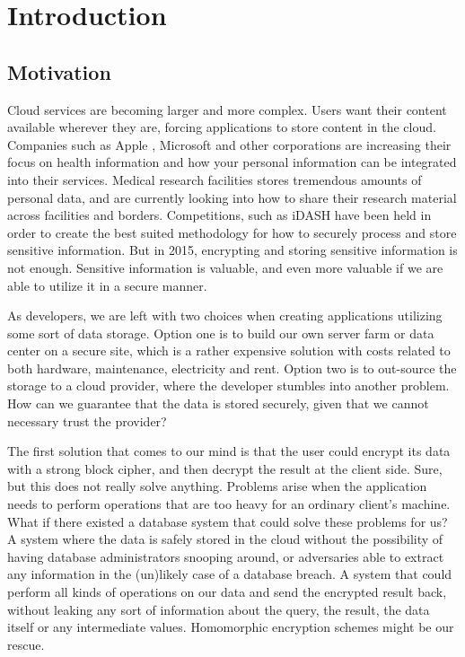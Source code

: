 \chapter{Introduction}
\label{chp:introduction}

\section{Motivation}

Cloud services are becoming larger and more complex. Users want their content available wherever they are, forcing applications to store content in the cloud. Companies such as Apple \cite{apple_health}, Microsoft \cite{microsoft_health} and other corporations are increasing their focus on health information and how your personal information can be integrated into their services. Medical research facilities stores tremendous amounts of personal data, and are currently looking into how to share their research material across facilities and borders. Competitions, such as iDASH \cite{iDASH} have been held in order to create the best suited methodology for how to securely process and store sensitive information. But in 2015, encrypting and storing sensitive information is not enough. Sensitive information is valuable, and even more valuable if we are able to utilize it in a secure manner. 
 

As developers, we are left with two choices when creating applications utilizing some sort of data storage. Option one is to build our own server farm or data center on a secure site, which is a rather expensive solution with costs related to both hardware, maintenance, electricity and rent. Option two is to out-source the storage to a cloud provider, where the developer stumbles into another problem. How can we guarantee that the data is stored securely, given that we cannot necessary trust the provider?

The first solution that comes to our mind is that the user could encrypt its data with a strong block cipher, and then decrypt the result at the client side. Sure, but this does not really solve anything. Problems arise when the application needs to perform operations that are too heavy for an ordinary client's machine. What if there existed a database system that could solve these problems for us? A system where the data is safely stored in the cloud without the possibility of having database administrators snooping around, or adversaries able to extract any information in the (un)likely case of a database breach. A system that could perform all kinds of operations on our data and send the encrypted result back, without leaking any sort of information about the query, the result, the data itself or any intermediate values. Homomorphic encryption schemes might be our rescue.

